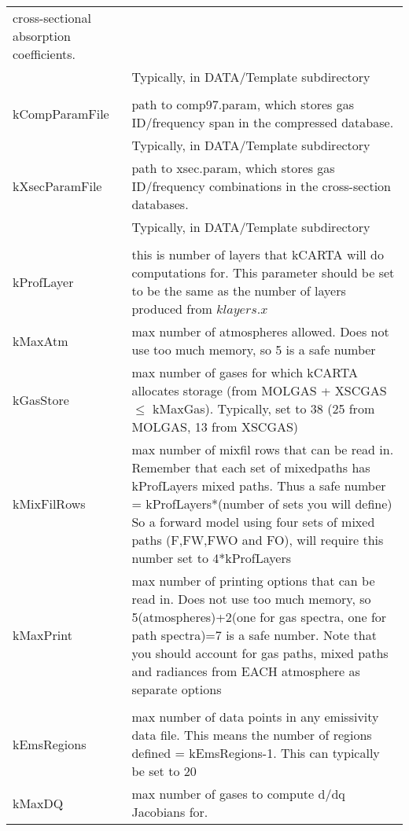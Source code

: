 \documentclass[12pt]{article}
\newlength{\colwidth}
\begin{document}
\begin{longtable}{|l|p{\colwidth}|}
               cross-sectional absorption coefficients.\\
              & Typically, in DATA/Template subdirectory\\ \hline \hline
           & \\
kCompParamFile & path to {\sf comp97.param}, which stores gas ID/frequency
               span in the compressed database.\\
              & Typically, in DATA/Template subdirectory\\ 
kXsecParamFile & path to {\sf xsec.param}, which stores gas ID/frequency
               combinations in the cross-section databases.\\ 
              & Typically, in DATA/Template subdirectory\\ \hline
           & \\
kProfLayer & this is number of layers that kCARTA will do computations for.
             This parameter should be set to be the same as the number of 
             layers produced from $klayers.x$\\
kMaxAtm    & max number of atmospheres allowed. 
           Does not use too much memory, so 5 is a safe number\\ \hline
kGasStore  &  max number of gases for which kCARTA allocates storage
           (from MOLGAS + XSCGAS  $\le$  kMaxGas).  Typically, set to 38
           (25 from MOLGAS, 13 from XSCGAS) \\ 
kMixFilRows& max number of mixfil rows that can be read in.
         Remember that each set of mixedpaths has kProfLayers mixed paths. 
         Thus a safe number = kProfLayers*(number of sets you will define)
         So a forward model using four sets of mixed paths (F,FW,FWO and FO), 
         will require this number set to 4*kProfLayers\\
kMaxPrint  & max number of printing options that can be read in.  Does not use 
            too much memory, so 5(atmospheres)+2(one for gas spectra, one 
            for path spectra)=7 is a safe number. 
           Note that you should account for gas paths, mixed paths and
           radiances from EACH atmosphere as separate options\\ \hline
         & \\
kEmsRegions & max number of data points in any emissivity data file.
            This means the number of regions defined = kEmsRegions-1.
            This can typically be set to 20\\ 
kMaxDQ     & max number of gases to compute d/dq Jacobians for.

\end{longtable}
\end{document}
